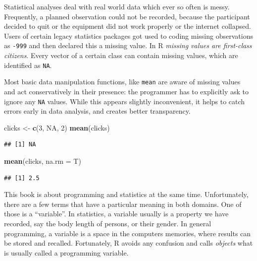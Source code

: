 \documentclass[]{svmono}
\newenvironment{Shaded}{\begin{snugshade}}{\end{snugshade}}
\newcommand{\KeywordTok}[1]{\textcolor[rgb]{0.13,0.29,0.53}{\textbf{#1}}}
\newcommand{\DataTypeTok}[1]{\textcolor[rgb]{0.13,0.29,0.53}{#1}}
\newcommand{\DecValTok}[1]{\textcolor[rgb]{0.00,0.00,0.81}{#1}}
\newcommand{\StringTok}[1]{\textcolor[rgb]{0.31,0.60,0.02}{#1}}
\newcommand{\OtherTok}[1]{\textcolor[rgb]{0.56,0.35,0.01}{#1}}
\newcommand{\NormalTok}[1]{#1}
\theoremstyle{definition}
\theoremstyle{definition}
\theoremstyle{definition}
\theoremstyle{remark}
\begin{document}
Statistical analyses deal with real world data which ever so often is
messy. Frequently, a planned observation could not be recorded, because
the participant decided to quit or the equipment did not work properly
or the internet collapsed. Users of certain legacy statistics packages
got used to coding missing observations as \texttt{-999} and then
declared this a missing value. In R \emph{missing values are first-class
citizens}. Every vector of a certain class can contain missing values,
which are identified as \texttt{NA}.

Most basic data manipulation functions, like \texttt{mean} are aware of
missing values and act conservatively in their presence: the programmer
has to explicitly ask to ignore any \texttt{NA} values. While this
appears slightly inconvenient, it helps to catch errors early in data
analysis, and creates better transparency.

\begin{Shaded}
\begin{Highlighting}[]
\NormalTok{clicks <-}\StringTok{ }\KeywordTok{c}\NormalTok{(}\DecValTok{3}\NormalTok{, }\OtherTok{NA}\NormalTok{, }\DecValTok{2}\NormalTok{)}
\KeywordTok{mean}\NormalTok{(clicks)}
\end{Highlighting}
\end{Shaded}

\begin{verbatim}
## [1] NA
\end{verbatim}

\begin{Shaded}
\begin{Highlighting}[]
\KeywordTok{mean}\NormalTok{(clicks, }\DataTypeTok{na.rm =}\NormalTok{ T)}
\end{Highlighting}
\end{Shaded}

\begin{verbatim}
## [1] 2.5
\end{verbatim}

This book is about programming and statistics at the same time.
Unfortunately, there are a few terms that have a particular meaning in
both domains. One of those is a ``variable''. In statistics, a variable
usually is a property we have recorded, say the body length of persons,
or their gender. In general programming, a variable is a space in the
computers memories, where results can be stored and recalled.
Fortunately, R avoids any confusion and calls \emph{objects} what is
usually called a programming variable.
\end{document}
